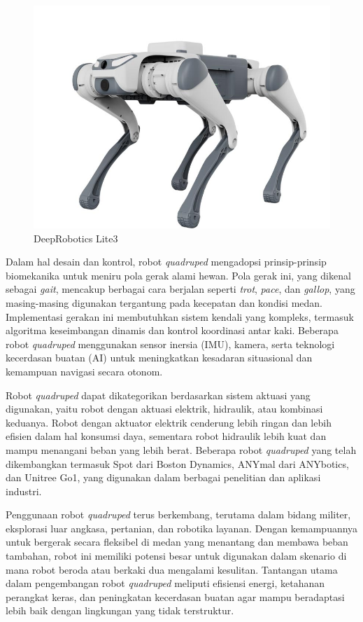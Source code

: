 \begin{figure} [H] \centering
  \includegraphics[scale=0.3]{gambar/quadruped_robot.jpg}
  \caption{DeepRobotics Lite3\parencite{img_QuadrupedRobot}}
  \label{fig:quadruped_robot}
\end{figure}

Dalam hal desain dan kontrol, robot \emph{quadruped} mengadopsi prinsip-prinsip biomekanika
untuk meniru pola gerak alami hewan. Pola gerak ini, yang dikenal sebagai \emph{gait},
mencakup berbagai cara berjalan seperti \emph{trot}, \emph{pace}, dan \emph{gallop},
yang masing-masing digunakan tergantung pada kecepatan dan kondisi medan.
Implementasi gerakan ini membutuhkan sistem kendali yang kompleks,
termasuk algoritma keseimbangan dinamis dan kontrol koordinasi antar kaki.
Beberapa robot \emph{quadruped} menggunakan sensor inersia (IMU), kamera,
serta teknologi kecerdasan buatan (AI) untuk meningkatkan kesadaran situasional dan kemampuan navigasi secara otonom.  

Robot \emph{quadruped} dapat dikategorikan berdasarkan sistem aktuasi yang digunakan,
yaitu robot dengan aktuasi elektrik, hidraulik, atau kombinasi keduanya.
Robot dengan aktuator elektrik cenderung lebih ringan dan lebih efisien dalam hal konsumsi daya,
sementara robot hidraulik lebih kuat dan mampu menangani beban yang lebih berat.
Beberapa robot \emph{quadruped} yang telah dikembangkan termasuk Spot dari Boston Dynamics,
ANYmal dari ANYbotics, dan Unitree Go1, yang digunakan dalam berbagai penelitian dan aplikasi industri.  

Penggunaan robot \emph{quadruped} terus berkembang, terutama dalam bidang militer, eksplorasi luar angkasa,
pertanian, dan robotika layanan. Dengan kemampuannya untuk bergerak secara fleksibel di medan yang menantang
dan membawa beban tambahan, robot ini memiliki potensi besar untuk digunakan dalam
skenario di mana robot beroda atau berkaki dua mengalami kesulitan.
Tantangan utama dalam pengembangan robot \emph{quadruped} meliputi efisiensi energi, ketahanan perangkat keras,
dan peningkatan kecerdasan buatan agar mampu beradaptasi lebih baik dengan lingkungan yang tidak terstruktur.

